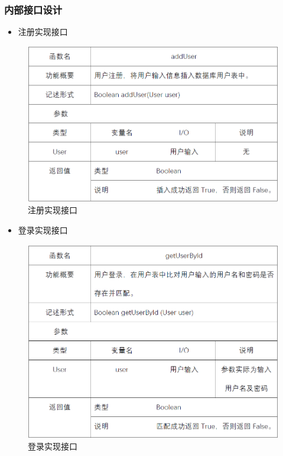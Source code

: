 \subsubsection{内部接口设计}
\begin{itemize}
	\item 注册实现接口
\end{itemize}
\begin{figure}[!htbp]
	\centering
	\includegraphics[scale=0.7]{image/b2.png} %
	\caption{注册实现接口} %
\end{figure}
\begin{itemize} 
	\item 登录实现接口
\end{itemize}
\begin{figure}[!htbp]
	\centering
	\includegraphics[scale=0.7]{image/b3.png} %
	\caption{登录实现接口} %
\end{figure}

